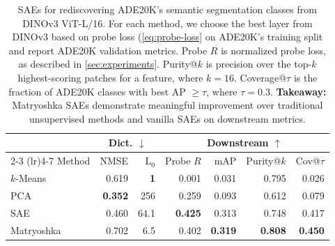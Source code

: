 \documentclass[10pt,twocolumn,letterpaper]{article}
\begin{document}
\begin{table}[t]
    \centering
    \small
    \setlength{\tabcolsep}{3pt}
    \caption{SAEs for rediscovering ADE20K's semantic segmentation classes from DINOv3 ViT-L/16.
    For each method, we choose the best layer from DINOv3 based on probe loss (\cref{eq:probe-loss} on ADE20K's training split and report ADE20K validation metrics.
    Probe $R$ is normalized probe loss, as described in \cref{sec:experiments}.
    Purity@$k$ is precision over the top-$k$ highest-scoring patches for a feature, where $k=16$.
    Coverage@$\tau$ is the fraction of ADE20K classes with best AP $\geq\tau$, where $\tau= 0.3$.
    \textbf{Takeaway:} Matryoshka SAEs demonstrate meaningful improvement over traditional unsupervised methods and vanilla SAEs on downstream metrics.}
    \label{tab:ade20k}
    \begin{tabular}{lrrrrrr}
    \toprule
    & \multicolumn{2}{c}{Dict. $\downarrow$} & \multicolumn{4}{c}{Downstream $\uparrow$} \\
    \cmidrule(lr){2-3} \cmidrule(lr){4-7}
    Method & NMSE & L$_0$ & Probe $R$ & mAP & Purity@$k$ & Cov@$\tau$ \\
    \midrule
    $k$-Means & 0.619 & \textbf{1} & 0.001 & 0.031 & 0.795 & 0.026 \\  %
    PCA & \textbf{0.352} & 256 & 0.259 & 0.093 & 0.612 & 0.079 \\ %
    SAE & 0.460 & 64.1 & \textbf{0.425} & 0.313 & 0.748 & 0.417 \\  %
    Matryoshka & 0.702 & 6.5 & 0.402 & \textbf{0.319} & \textbf{0.808} & \textbf{0.450} \\  %
    \bottomrule
    \end{tabular}
\end{table}
\end{document}
